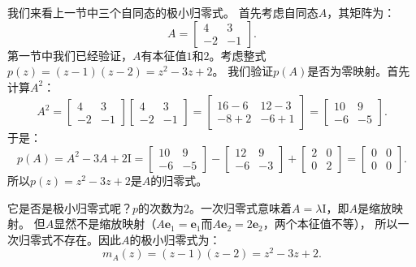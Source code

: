 \documentclass[12pt,UTF8,fontset=none]{ctexbook}
\begin{document}
我们来看上一节中三个自同态的极小归零式。
首先考虑自同态$A$，其矩阵为：
$$
A = \begin{bmatrix} 4 & 3 \\ -2 & -1 \end{bmatrix}.
$$
第一节中我们已经验证，$A$有本征值$1$和$2$。考虑整式$p(z) = (z-1)(z-2) = z^2 - 3z + 2$。
我们验证$p(A)$是否为零映射。首先计算$A^2$：
$$
A^2 = \begin{bmatrix} 4 & 3 \\ -2 & -1 \end{bmatrix}\begin{bmatrix} 4 & 3 \\ -2 & -1 \end{bmatrix} = \begin{bmatrix} 16-6 & 12-3 \\ -8+2 & -6+1 \end{bmatrix} = \begin{bmatrix} 10 & 9 \\ -6 & -5 \end{bmatrix}.
$$
于是：
$$
p(A) = A^2 - 3A + 2\mathrm{I} = \begin{bmatrix} 10 & 9 \\ -6 & -5 \end{bmatrix} - \begin{bmatrix} 12 & 9 \\ -6 & -3 \end{bmatrix} + \begin{bmatrix} 2 & 0 \\ 0 & 2 \end{bmatrix} = \begin{bmatrix} 0 & 0 \\ 0 & 0 \end{bmatrix}.
$$
所以$p(z) = z^2 - 3z + 2$是$A$的归零式。

它是否是极小归零式呢？$p$的次数为$2$。一次归零式意味着$A = \lambda\mathrm{I}$，即$A$是缩放映射。
但$A$显然不是缩放映射（$A\mathbf{e}_1 = \mathbf{e}_1$而$A\mathbf{e}_2 = 2\mathbf{e}_2$，两个本征值不等），
所以一次归零式不存在。因此$A$的极小归零式为：
$$
m_A(z) = (z-1)(z-2) = z^2 - 3z + 2.
$$
\end{document}
